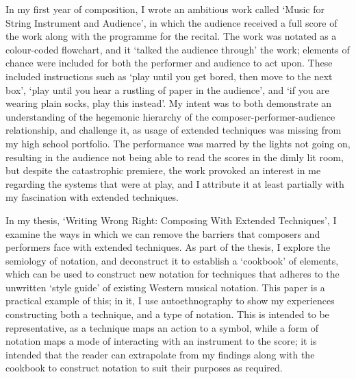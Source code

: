 In my first year of composition, I wrote an ambitious work called `Music for String Instrument and Audience', in which the audience received a full score of the work along with the programme for the recital.
The work was notated as a colour-coded flowchart, and it `talked the audience through' the work; elements of chance were included for both the performer and audience to act upon.
These included instructions such as `play until you get bored, then move to the next box', `play until you hear a rustling of paper in the audience', and `if you are wearing plain socks, play this instead'.
My intent was to both demonstrate an understanding of the hegemonic hierarchy of the composer-performer-audience relationship, and challenge it, as usage of extended techniques was missing from my high school portfolio.
The performance was marred by the lights not going on, resulting in the audience not being able to read the scores in the dimly lit room, but despite the catastrophic premiere, the work provoked an interest in me regarding the systems that were at play, and I attribute it at least partially with my fascination with extended techniques.

In my thesis, `Writing Wrong Right: Composing With Extended Techniques', I examine the ways in which we can remove the barriers that composers and performers face with extended techniques.
As part of the thesis, I explore the semiology of notation, and deconstruct it to establish a `cookbook' of elements, which can be used to construct new notation for techniques that adheres to the unwritten `style guide' of existing Western musical notation.
This paper is a practical example of this; in it, I use autoethnography to show my experiences constructing both a technique, and a type of notation. 
This is intended to be representative, as a technique maps an action to a symbol, while a form of notation maps a mode of interacting with an instrument to the score;
it is intended that the reader can extrapolate from my findings along with the cookbook to construct notation to suit their purposes as required.